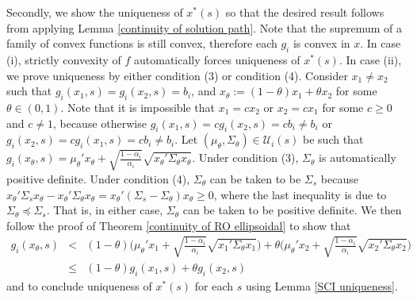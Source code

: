 \documentclass[mnsc,blindrev]{informs4} %
\begin{document}
Secondly, we show the uniqueness of $x^*(s)$ so that the desired result follows from applying Lemma \ref{continuity of solution path}. Note that the supremum of a family of convex functions is still convex, therefore each $g_i$ is convex in $x$. In case (i), strictly convexity of $f$ automatically forces uniqueness of $x^*(s)$. In case (ii), we prove uniqueness by either condition (3) or condition (4). Consider $x_1\neq x_2$ such that $g_i(x_1,s)=g_i(x_2,s)=b_i$, and $x_{\theta}:=(1-\theta)x_1+\theta x_2$ for some $\theta \in(0,1)$. Note that it is impossible that $x_1=cx_2$ or $x_2=cx_1$ for some $c\geq 0$ and $c\neq 1$, because otherwise $g_i(x_1,s)= cg_i(x_2,s)=cb_i\neq b_i$ or $g_i(x_2,s)= cg_i(x_1,s)=cb_i\neq b_i$. Let $(\mu_{\theta},\Sigma_{\theta})\in\mathcal U_i(s)$ be such that $g_i(x_{\theta},s)={\mu_{\theta}}'x_{\theta}+\sqrt{\frac{1-\alpha_i}{\alpha_i}}\sqrt{x_{\theta}'\Sigma_{\theta} x_{\theta}}$. Under condition (3), $\Sigma_{\theta}$ is automatically positive definite. Under condition (4), $\Sigma_{\theta}$ can be taken to be $\Sigma_s$ because $x_{\theta}'\Sigma_sx_{\theta}-x_{\theta}'\Sigma_{\theta}x_{\theta}=x_{\theta}'(\Sigma_s-\Sigma_{\theta})x_{\theta}\geq 0$, where the last inequality is due to $\Sigma_{\theta}\preceq \Sigma_s$. That is, in either case, $\Sigma_{\theta}$ can be taken to be positive definite. We then follow the proof of Theorem \ref{continuity of RO ellipsoidal} to show that
\begin{eqnarray*}
g_i(x_{\theta},s)&< &(1-\theta)\big({\mu_{\theta}}'x_1+\sqrt{\frac{1-\alpha_i}{\alpha_i}}\sqrt{x_1'\Sigma_{\theta} x_1}\big)+\theta\big({\mu_{\theta}}'x_2+\sqrt{\frac{1-\alpha_i}{\alpha_i}}\sqrt{x_2'\Sigma_{\theta} x_2}\big)\\
&\leq &(1-\theta)g_i(x_1,s)+\theta g_i(x_2,s)
\end{eqnarray*}
and to conclude uniqueness of $x^*(s)$ for each $s$ using Lemma \ref{SCI uniqueness}.\hfill\Halmos
\end{document}
